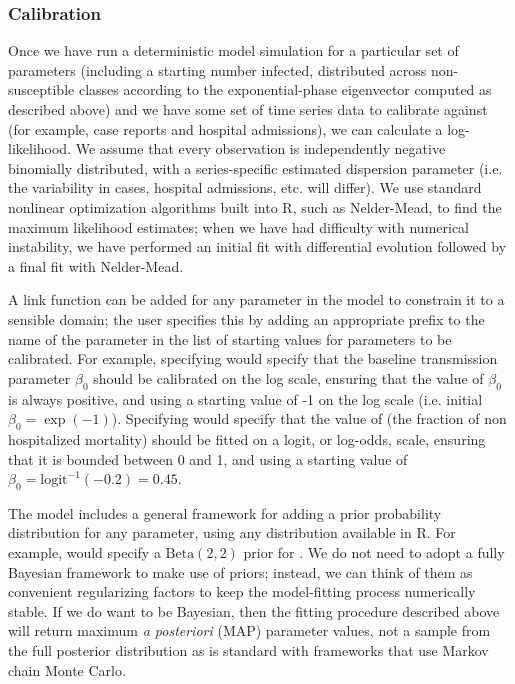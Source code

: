 \documentclass[12pt]{article}\usepackage[]{graphicx}\usepackage[]{color}
\begin{document}
\subsubsection*{Calibration}

Once we have run a deterministic model simulation for a particular set of parameters (including a starting number infected, distributed across non-susceptible classes according to the exponential-phase eigenvector computed as described above) and we have some set of time series data to calibrate against (for example, case reports and hospital admissions), we can calculate a log-likelihood. 
We assume that every observation is independently negative binomially distributed, with a series-specific estimated dispersion parameter (i.e. the variability in cases, hospital admissions, etc. will differ). 
We use standard nonlinear optimization algorithms built into R, such as Nelder-Mead, to find the maximum likelihood estimates; when we have had difficulty with numerical instability, we have performed an initial fit with differential evolution \cite{Mull+11} followed by a final fit with Nelder-Mead.

A link function can be added for any parameter in the model to constrain it to a sensible domain; the user specifies this by adding an appropriate prefix to the name of the parameter in the list of starting values for parameters to be calibrated. 
For example, specifying  would specify that the baseline transmission parameter $\beta_0$ should be calibrated on the log scale, ensuring that the value of $\beta_0$ is always positive, and using a starting value of -1 on the log scale (i.e. initial $\beta_0 = \exp(-1)$). 
Specifying  would specify that the value of  (the fraction of non hospitalized mortality) should be fitted on a logit, or log-odds, scale, ensuring that it is bounded between 0 and 1, and using a starting value of $\beta_0 = \textrm{logit}^{-1}(-0.2) = 0.45$.

The model includes a general framework for adding a prior probability distribution for any parameter, using any distribution available in R. 
For example,  would specify a $\textrm{Beta}(2,2)$ prior for .
We do not need to adopt a fully Bayesian framework to make use of priors; instead, we can think of them as convenient regularizing factors to keep the model-fitting process numerically stable. If we do want to be Bayesian, then the fitting procedure described above will return maximum \emph{a posteriori} (MAP) parameter values, not a sample from the full posterior distribution as is standard with frameworks that use Markov chain Monte Carlo.
\end{document}

